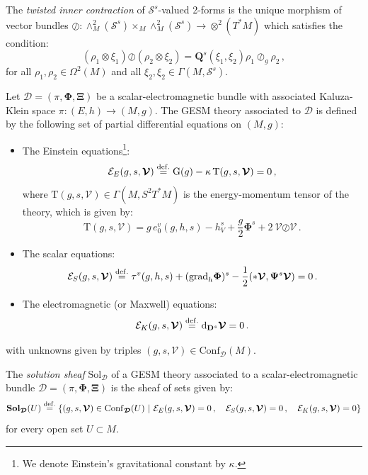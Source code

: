 \documentclass[10pt, cmp, numbook, final, a4paper]{svjour}
\newcommand{\eqdef}{\stackrel{{\rm def.}}{=}}
\def\bD{\mathbb{D}}
\def\dd{\mathrm{d}}
\def\bcD{\boldsymbol{\mathcal{D}}}
\def\bPsi{\mathbf{\Psi}}
\newcommand{\be}{\begin{equation*}}
\newcommand{\ee}{\end{equation*}}
\newcommand{\ben}{\begin{equation}}
\newcommand{\een}{\end{equation}}
\def\loslash{\bm{\oslash}}
\def\cE{\check{E}}
\def\bXi{{\boldsymbol{\Xi}}}
\def\G_2{\mathrm{G_2}}
\def\cV{\mathcal{V}}
\def\G{\mathrm{G}}
\def\cE{\mathcal{E}}
\def\bPhi{\mathbf{\Phi}}
\def\bSol{\mathbf{Sol}}
\def\grad{\mathrm{grad}}
\def\bD{\mathbf{D}}
\def\bQ{\boldsymbol{Q}}
\def\Sol{\mathrm{Sol}}
\def\Conf{\mathrm{Conf}}
\def\bcS{\boldsymbol{\mathcal{S}}}
\def\bD{\mathbf{D}}
\def\bcV{\boldsymbol{\cV}}
\begin{document}
\begin{definition}
The {\em twisted inner contraction} of $\bcS^{s}$-valued 2-forms is
the unique morphism of vector bundles
$\loslash\colon\wedge_M^2(\bcS^{s})\times_M\wedge_M^2(\bcS^{s})\rightarrow\otimes^2(T^\ast
M)$ which satisfies the condition:
\begin{equation*}
(\rho_1\otimes \xi_1)\loslash (\rho_2\otimes \xi_2)= \bQ^{s} (\xi_1,\xi_2) \rho_1 \oslash_g\rho_2\, ,
\end{equation*}
for all $\rho_1,\rho_2\in \Omega^2(M)$ and all $\xi_2,\xi_2\in \Gamma(M,\bcS^{s})$. 
\end{definition}

\begin{definition}
Let $\bcD = (\pi,\bPhi,\bXi)$ be a scalar-electromagnetic bundle with
associated Kaluza-Klein space $\pi\colon (E,h)\to (M,g)$. The 
GESM theory associated to $\bcD$ is defined by the following set of
partial differential equations on $(M,g)$:
\begin{itemize}
\item The Einstein equations\footnote{We denote Einstein's gravitational constant by $\kappa$.}:	
\begin{equation}
\cE_{E}(g,s,\bcV) \eqdef \G(g) -\kappa\,\mathrm{T}(g,s,\bcV) = 0\, ,
\end{equation}
where $\mathrm{T}(g,s,\bcV)\in\Gamma(M,S^{2}T^{\ast}M)$ is the
energy-momentum tensor of the theory, which is given by:
\begin{equation*}
\mathrm{T}(g,s,\bcV)  = g\, e^{v}_{0}(g,h,s) - h^{s}_{V} + \frac{g}{2} \bPhi^{s}  + 2~\bcV \loslash \bcV \, .
\end{equation*} 

\item The scalar equations:
\ben
\label{sc}
\cE_{S}(g,s,\bcV) \eqdef \tau^{v}(g,h,s) + (\grad_{h} \bPhi)^{s}- \frac{1}{2} (\ast \bcV , \bPsi^s\bcV) = 0\, .
\een
\item The electromagnetic (or Maxwell) equations:
\begin{equation}
\cE_{K}(g,s,\bcV) \eqdef\dd_{\bD^s} \bcV=0\, .
\end{equation}	

\end{itemize}

\noindent
with unknowns given by triples $(g,s,\bcV)\in \Conf_{\bcD}(M)$.
\end{definition}		

\begin{definition}
The {\em solution sheaf} $\Sol_{\bcD}$ of a GESM theory associated to
a scalar-electromagnetic bundle $\bcD = (\pi,\bPhi,\bXi)$ is the sheaf
of sets given by:
\be
\bSol_{\bcD}(U)\eqdef \{(g,s,\bcV)\in \Conf_{\bcD}(U) \,\, |\,\, \cE_{E}(g,s,\bcV) = 0\, , \quad  \cE_{S}(g,s,\bcV) = 0\, , \quad \cE_{K}(g,s,\bcV) = 0\}
\ee
for every open set $U\subset M$.
\end{definition}
\end{document}
